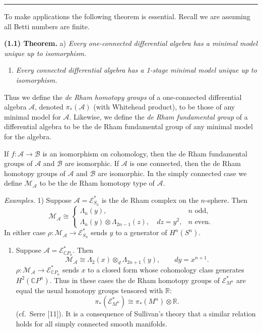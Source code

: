 \documentclass[
  english,
  a3paper,
  a3paper]{extarticle}
\providecommand{\tightlist}{%
  \setlength{\itemsep}{0pt}\setlength{\parskip}{0pt}}
\begin{document}
\par

\vspace{0.7mm}\hrule\vspace{1.6mm}

\fontsize{9}{11}\selectfont

To make applications the following theorem is essential. Recall we are
assuming all Betti numbers are finite.

\textbf{(1.1) Theorem.} a) \emph{Every one-connected differential
algebra has a minimal model unique up to isomorphism.}

\begin{enumerate}
\def\labelenumi{\alph{enumi})}
\setcounter{enumi}{1}
\tightlist
\item
  \emph{Every connected differential algebra has a 1-stage minimal model
  unique up to isomorphism.}
\end{enumerate}

Thus we define the \emph{de Rham homotopy groups} of a one-connected
differential algebra \(\mathscr A\), denoted \(\pi_*(\mathscr A)\) (with
Whitehead product), to be those of any minimal model for \(\mathscr A\).
Likewise, we define the \emph{de Rham fundamental group} of a
differential algebra to be the de Rham fundamental group of any minimal
model for the algebra.

If \(f:\mathscr A\to\mathscr B\) is an isomorphism on cohomology, then
the de Rham fundamental groups of \(\mathscr A\) and \(\mathscr B\) are
isomorphic. If \(\mathscr A\) is one connected, then the de Rham
homotopy groups of \(\mathscr A\) and \(\mathscr B\) are isomorphic. In
the simply connected case we define \(\mathcal M_{\mathscr A}\) to be
the de Rham homotopy type of \(\mathscr A\).

\emph{Examples.} 1) Suppose \(\mathscr A=\mathscr E^*_{S_n}\) is the de
Rham complex on the \(n\)-sphere. Then \[
\mathcal M_{\mathscr A}\cong
\begin{cases}
\Lambda_n(y),&n\text{ odd},\\
\Lambda_n(y)\otimes\Lambda_{2n-1}(z),\quad dz=y^2,&n\text{ even}.
\end{cases}
\] In either case \(\rho:\mathcal M_{\mathscr A}\to\mathscr E^*_{S_n}\)
sends \(y\) to a generator of \(H^n(S^n)\).

\begin{enumerate}
\def\labelenumi{\arabic{enumi})}
\setcounter{enumi}{1}
\tightlist
\item
  Suppose \(\mathscr A=\mathscr E^*_{\mathbb CP_n}\). Then \[
  \mathcal M_{\mathscr A}\cong\Lambda_2(x)\otimes_d\Lambda_{2n+1}(y),\qquad dy=x^{n+1}.
  \] \(\rho:\mathcal M_{\mathscr A}\to\mathscr E^*_{\mathbb CP_n}\)
  sends \(x\) to a closed form whose cohomology class generates
  \(H^2(\mathbb CP^n)\). Thus in these cases the de Rham homotopy groups
  of \(\mathscr E^*_{M^n}\) are equal the usual homotopy groups tensored
  with \(\mathbb R\): \[
  \pi_*(\mathscr E^*_{M^n})\cong\pi_*(M^n)\otimes\mathbb R.
  \] (cf.~Serre {[}11{]}). It is a consequence of Sullivan's theory that
  a similar relation holds for all simply connected smooth manifolds.
\end{enumerate}
\end{document}
